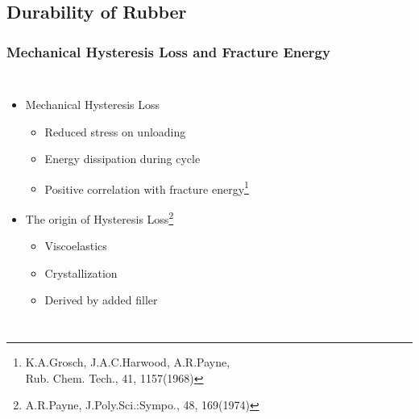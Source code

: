 \documentclass[12pt, dvipdfmx]{beamer}
\begin{document}
\subsection{Durability of Rubber}
\begin{frame}
	\frametitle{Mechanical Hysteresis Loss and Fracture Energy}
	\vspace{-1mm}
			\begin{columns}[T, onlytextwidth]
					\begin{itemize}
						\item Mechanical Hysteresis Loss 
							\begin{itemize}
								\item Reduced stress on unloading
								\item Energy dissipation during cycle
								\item \alert{Positive correlation} with fracture energy\footnote{
									\scriptsize{K.A.Grosch, J.A.C.Harwood, A.R.Payne, \\Rub. Chem. Tech., 41, 1157(1968)}
								}
							\end{itemize}
						\item The origin of Hysteresis Loss\footnote{
							\scriptsize{A.R.Payne, J.Poly.Sci.:Sympo., 48, 169(1974)}
						}
						\begin{itemize}
							\item \alert{Viscoelastics}
							\color{blue}
							\item Crystallization
							\item Derived by added filler
						\end{itemize}
					\end{itemize}
				\begin{center}
					\vspace{-2mm}

\end{center}
\end{columns}
\end{frame}
\end{document}
